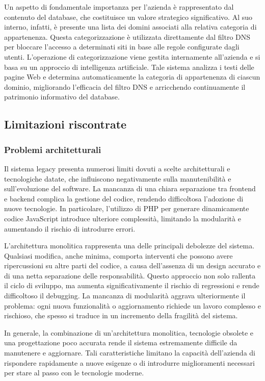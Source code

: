 Un aspetto di fondamentale importanza per l'azienda è rappresentato dal contenuto del database, che costituisce un valore strategico significativo. Al suo interno, infatti, è presente una lista dei domini associati alla relativa categoria di appartenenza. Questa categorizzazione è utilizzata direttamente dal filtro DNS per bloccare l'accesso a determinati siti in base alle regole configurate dagli utenti. L'operazione di categorizzazione viene gestita internamente all'azienda e si basa su un approccio di intelligenza artificiale. Tale sistema analizza i testi delle pagine Web e determina automaticamente la categoria di appartenenza di ciascun dominio, migliorando l'efficacia del filtro DNS e arricchendo continuamente il patrimonio informativo del database.

\subsection{Limitazioni riscontrate}
\subsubsection{Problemi architetturali}
Il sistema legacy presenta numerosi limiti dovuti a scelte architetturali e tecnologiche datate, che influiscono negativamente sulla manutenibilità e sull'evoluzione del software. La mancanza di una chiara separazione tra frontend e backend complica la gestione del codice, rendendo difficoltosa l’adozione di nuove tecnologie. In particolare, l’utilizzo di PHP per generare dinamicamente codice JavaScript introduce ulteriore complessità, limitando la modularità e aumentando il rischio di introdurre errori.

L’architettura monolitica rappresenta una delle principali debolezze del sistema. Qualsiasi modifica, anche minima, comporta interventi che possono avere ripercussioni su altre parti del codice, a causa dell’assenza di un design accurato e di una netta separazione delle responsabilità. Questo approccio non solo rallenta il ciclo di sviluppo, ma aumenta significativamente il rischio di regressioni e rende difficoltoso il debugging. La mancanza di modularità aggrava ulteriormente il problema: ogni nuova funzionalità o aggiornamento richiede un lavoro complesso e rischioso, che spesso si traduce in un incremento della fragilità del sistema.

In generale, la combinazione di un'architettura monolitica, tecnologie obsolete e una progettazione poco accurata rende il sistema estremamente difficile da manutenere e aggiornare. Tali caratteristiche limitano la capacità dell'azienda di rispondere rapidamente a nuove esigenze o di introdurre miglioramenti necessari per stare al passo con le tecnologie moderne.

